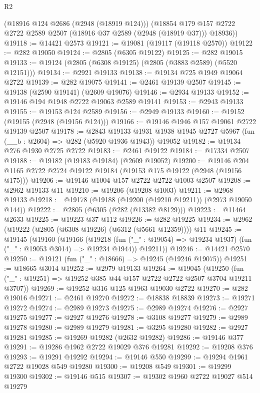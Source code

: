 \begin{lexlean}{R2}
\begin{coremodule}
      (@18916 @124 @2686 (@2948 (@18919 @124)))
      (@18854 @179 @157 @2722 @2722 @2589 @2507 (@18916 @37 @2589 (@2948 (@18919 @37))) @18936))
@19118 := @14421 @2573
@19121 := @19081 (@19117 (@19118 @2570))
@19122 := @282 @19050
@19124 := @2805 (@6305 @19122)
@19125 := @282 @19015
@19133 := @19124 (@2805 (@6308 @19125) (@2805 (@3883 @2589) (@5520 @12151)))
@19134 := @2921 @19133
@19138 := @19134 @725 @1949 @19064 @2722
@19139 := @282 @19075
@19141 := @2461 @19139 @2507
@19145 := @19138 (@2590 @19141) (@2609 @19076)
@19146 := @2934 @19133
@19152 := @19146 @194 @1948 @2722 @19063 @2589 @19141
@19153 := @2943 @19133
@19155 := @19153 @124 @2589
@19156 := @2949 @19133
@19160 := @19152 (@19155 (@2948 (@19156 @124)))
@19166 := @19146 @1946 @157 @19061 @2722 @19139 @2507
@19178 := @2843
    @19133
    @1931
    @1938
    @1945
    @2727
    @5967
    (fun (__b : @2604) => @282 (@5920 @1936 @1943))
    @19052
@19182 := @19134 @276 @1930 @2725 @2722
@19183 := @2461 @19122
@19184 := @17334 @2507
@19188 := @19182 (@19183 @19184) (@2609 @19052)
@19200 := @19146 @204 @1165 @2722 @2724 @19122 @19184 (@19153 @175 @19122 (@2948 (@19156 @175)))
@19206 := @19146 @1004 @157 @2722 @2722 @1003 @2507
@19208 := @2962 @19133 @11
@19210 := @19206 (@19208 @1003)
@19211 := @2968 @19133
@19218 := @19178 (@19188 (@19200 (@19210 @19211)) (@2973 @19050 @144))
@19222 := @2805 (@6305 (@282 (@13382 @8129)))
@19223 := @11464 @2633
@19225 := @19223 @37 @112
@19226 := @282 @19225
@19234 := @2962 (@19222 (@2805 (@6308 @19226) (@6312 (@5661 @12359)))) @11
@19245 := @19145
    (@19160
      (@19166
        (@19218 (fun ("_" : @19054) => @19234 @1937) (fun ("_" : @19053 @3014) => @19234 @1944))
        @19211))
@19246 := @14421 @2570
@19250 := @19121 (fun ("_" : @18666) => @19245 (@19246 @19075))
@19251 := @18665 @3014
@19252 := @2979 @19133
@19264 := @19045
    (@19250 (fun ("_" : @19251) => @19252 @385 @44 @157 @2722 @2722 @2507 @3704 @19211 @3707))
@19269 := @19252 @316 @125 @1963 @19030 @2722
@19270 := @282 @19016
@19271 := @2461 @19270
@19272 := @18838 @18839
@19273 := @19271 @19272
@19274 := @2989 @19273
@19275 := @2989 @19274
@19276 := @2927 @19275
@19277 := @2927 @19276
@19278 := @3108 @19277
@19279 := @2989 @19278
@19280 := @2989 @19279
@19281 := @3295 @19280
@19282 := @2927 @19281
@19285 := @19269 @19282 (@2632 @19282)
@19286 := @19146 @377
@19291 := @19286 @1962 @2722 @19029 @376 @19281
@19292 := @19208 @376
@19293 := @19291 @19292
@19294 := @19146 @550
@19299 := @19294 @1961 @2722 @19028 @549 @19280
@19300 := @19208 @549
@19301 := @19299 @19300
@19302 := @19146 @515
@19307 := @19302 @1960 @2722 @19027 @514 @19279

\end{coremodule}
\end{lexlean}
